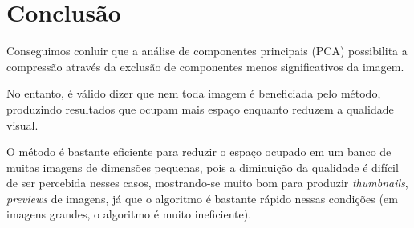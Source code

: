 \documentclass[brazilian,a4paper,twocolumn]{article}
\begin{document}
\section{Conclusão}

    Conseguimos conluir que a análise de componentes principais (PCA) possibilita a compressão através da exclusão de componentes menos significativos da imagem.

    No entanto, é válido dizer que nem toda imagem é beneficiada pelo método, produzindo resultados que ocupam mais espaço enquanto reduzem a qualidade visual.

    O método é bastante eficiente para reduzir o espaço ocupado em um banco de muitas imagens de dimensões pequenas, pois a diminuição da qualidade é difícil de ser percebida nesses casos, mostrando-se muito bom para produzir \textit{thumbnails}, \textit{previews} de imagens, já que o algoritmo é bastante rápido nessas condições (em imagens grandes, o algoritmo é muito ineficiente).
\end{document}
